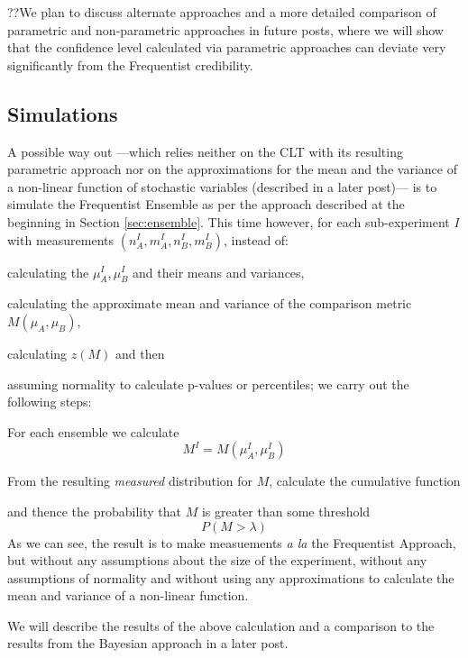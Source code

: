 \documentclass[letterpaper,12pt]{article}
\newcommand{\bdm}{\begin{displaymath}} %
\newcommand{\edm}{\end{displaymath}} %
\begin{document}
??We plan to discuss alternate approaches and a more
detailed comparison of parametric and non-parametric approaches in
future posts, where we will show that the confidence level calculated via parametric approaches
can deviate very significantly from the Frequentist credibility.

\subsection{Simulations}
A possible way out ---which relies neither on the CLT with its
resulting parametric approach nor on the approximations for the mean and the
variance of a non-linear function of stochastic variables (described in a
later post)--- is to simulate
the Frequentist Ensemble as per the approach described at the beginning in
Section \ref{sec:ensemble}.
This time however, for each sub-experiment \(I\) with
measurements \((n^I_A, m^I_A, n^I_B, m^I_B)\), instead of:
\be
\item calculating the
  \(\mu^I_A, \mu^I_B\) and their means and variances,
\item calculating the approximate mean and variance of the
  comparison metric \(M(\mu_A, \mu_B)\),
\item calculating \(z(M)\) and then
\item assuming normality to calculate p-values or percentiles;
\ee
we carry out the following steps:
\be
\item For each ensemble we calculate
  \bdm
  M^I = M(\mu^I_A, \mu^I_B)
  \edm
\item From the resulting {\em measured} distribution for \(M\), calculate
  the cumulative function
\item and thence the probability that \(M\) is greater
  than some threshold
  \bdm
  P(M>\lambda)
  \edm
\ee
As we can see, the result is to make measuements {\em a la} the Frequentist
Approach, but without any assumptions about the size of the experiment,
without any assumptions of normality and without using any approximations to
calculate the mean and variance of a non-linear function.  

We will describe the results of the above calculation and a comparison to the
results from the Bayesian approach in a later post.
\end{document}
